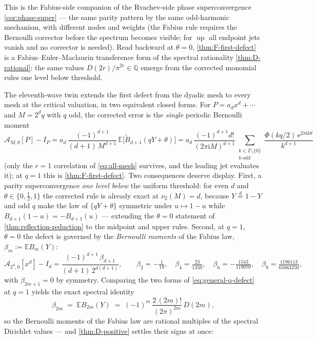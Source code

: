 \documentclass[11pt,oneside]{article}
\numberwithin{equation}{section}
\theoremstyle{definition}
\theoremstyle{remark}
\newcommand{\Q}{\mathbb Q}
\newcommand{\Z}{\mathbb Z}
\newcommand{\E}{\mathbb E}
\newcommand{\e}{\mathrm e}
\newcommand{\ii}{\mathrm i}
\newcommand{\Up}{\operatorname{up}}
\newcommand{\vtwo}{\nu_2}
\begin{document}
This is the Fabius-side companion of the Rvachev-side phase
superconvergence \cref{cor:phase-super} --- the same parity pattern by
the same odd-harmonic mechanism, with different nodes and weights (the
Fabius rule requires the Bernoulli corrector before the spectrum
becomes visible; for $\Up$ all endpoint jets vanish and no corrector is
needed).  Read backward at $\theta=0$, \cref{thm:F-first-defect} is a
Fabius--Euler--Maclaurin transference form of the spectral rationality
\cref{thm:D-rational}: the same values $D(2r)/\pi^{2r}\in\Q$ emerge
from the corrected monomial rules one level below threshold.

The eleventh-wave twin extends the first defect from the dyadic mesh
to every mesh at the critical valuation, in two equivalent closed
forms.  For $P=a_dx^{d}+\cdots$ and $M=2^{d}q$ with $q$ odd, the
corrected error is the \emph{single} periodic Bernoulli moment
\begin{equation}
 \mathcal A_{M,\theta}[P]-I_P
 =a_d\,\frac{(-1)^{d+1}}{(d+1)\,M^{d+1}}\,
 \E\bigl[\widetilde B_{d+1}(qY+\theta)\bigr]
 =a_d\,\frac{(-1)^{d+1}d!}{(2\pi\ii M)^{d+1}}
 \sum_{\substack{k\in\Z\setminus\{0\}\\ k\ \mathrm{odd}}}
 \frac{\Phi(kq/2)\,\e^{2\pi\ii k\theta}}{k^{d+1}}
 \label{eq:general-q-defect}
\end{equation}
(only the $r=1$ correlation of \eqref{eq:all-mesh} survives, and the
leading jet evaluates it); at $q=1$ this is
\cref{thm:F-first-defect}.  Two consequences deserve display.  First,
a parity superconvergence \emph{one level below} the uniform
threshold: for even $d$ and $\theta\in\{0,\tfrac12,1\}$ the corrected
rule is already exact at $\vtwo(M)=d$, because $Y\overset d=1-Y$ and
odd $q$ make the law of $\{qY+\theta\}$ symmetric under
$u\mapsto1-u$ while $B_{d+1}(1-u)=-B_{d+1}(u)$ --- extending the
$\theta=0$ statement of \cref{thm:reflection-reduction} to the
midpoint and upper rules.  Second, at $q=1$, $\theta=0$ the defect is
governed by the \emph{Bernoulli moments} of the Fabius law,
$\beta_m:=\E B_m(Y)$:
\begin{equation}
 \mathcal A_{2^{d},0}[x^{d}]-I_d
 =\frac{(-1)^{d+1}\,\beta_{d+1}}{(d+1)\,2^{d(d+1)}},
 \qquad
 \beta_2=-\tfrac1{18},\quad
 \beta_4=\tfrac{23}{1350},\quad
 \beta_6=-\tfrac{1543}{119070},\quad
 \beta_8=\tfrac{1196113}{65063250},
 \label{eq:beta-defect}
\end{equation}
with $\beta_{2m+1}=0$ by symmetry.  Comparing the two forms of
\eqref{eq:general-q-defect} at $q=1$ yields the exact spectral
identity
\begin{equation}
 \boxed{\;
 \beta_{2m}\;=\;\E B_{2m}(Y)
 \;=\;(-1)^{m}\,\frac{2\,(2m)!}{(2\pi)^{2m}}\,D(2m),\;}
 \label{eq:beta-D}
\end{equation}
so the Bernoulli moments of the Fabius law are rational multiples of
the spectral Dirichlet values --- and \cref{thm:D-positive} settles
their signs at once:
\end{document}
